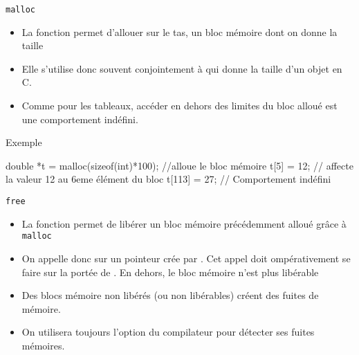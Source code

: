 \documentclass[10pt]{beamer}
\begin{document}
\begin{frame}[fragile]{\Ctitle}{\stitle}
	\begin{alertblock}{{\tt malloc}}
		\begin{itemize}
			\item<1-> La fonction  permet d'allouer sur le tas, un bloc mémoire dont on donne la taille
			\item<2-> Elle s'utilise donc souvent conjointement à  qui donne la taille d'un objet en C.
			\item<3-> Comme pour les tableaux, accéder en dehors des limites du bloc alloué est une comportement indéfini.
		\end{itemize}
	\end{alertblock}
	\begin{exampleblock}{Exemple}
		\onslide<4->
		\begin{langageC}
double *t =  malloc(sizeof(int)*100); //alloue le bloc mémoire
t[5] = 12; // affecte la valeur 12 au 6eme élément du bloc
t[113] = 27; // Comportement indéfini
		\end{langageC}
	\end{exampleblock}
\end{frame}

\begin{frame}[fragile]{\Ctitle}{\stitle}
	\begin{alertblock}{{\tt free}}
		\begin{itemize}
			\item<1-> La fonction  permet de libérer un bloc mémoire précédemment alloué grâce à {\tt malloc}
			\item<2-> On appelle donc  sur un pointeur crée  par . Cet appel doit ompérativement se faire sur la portée de . En dehors, le bloc mémoire n'est plus libérable
			\item<3-> Des blocs mémoire non libérés (ou non libérables) créent des fuites de mémoire.
			\item<4-> On utilisera toujours l'option  du compilateur pour détecter ses fuites mémoires.
		\end{itemize}
	\end{alertblock}
\end{frame}
\end{document}
